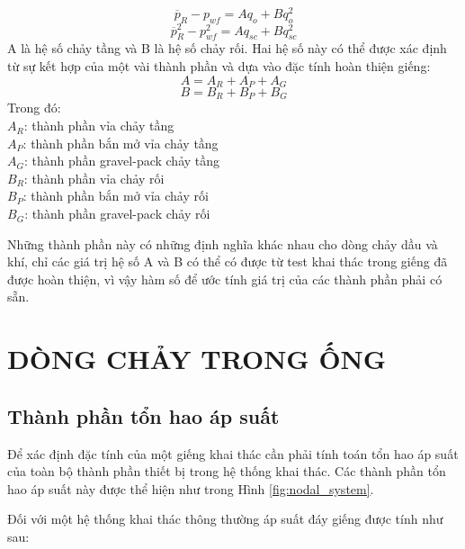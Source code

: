 \documentclass[12pt,a4paper]{report}
\begin{document}
	\begin{equation}
		\overline p_R - p_{wf} = Aq_o + Bq_o^2
	\end{equation}
	\begin{equation}
		\overline p_R^2 - p_{wf}^2 = Aq_{sc} + Bq_{sc}^2
	\end{equation}
A là hệ số chảy tầng và B là hệ số chảy rối. Hai hệ số này có thể được xác định từ sự kết hợp của một vài thành phần và dựa vào đặc tính hoàn thiện giếng:
	\begin{equation}
		A = A_R + A_P + A_G
	\end{equation}
	\begin{equation}
		B = B_R + B_P + B_G
	\end{equation}
Trong đó:\\
\hspace*{1cm}$A_R$: thành phần vỉa chảy tầng\\
\hspace*{1cm}$A_P$: thành phần bắn mở vỉa chảy tầng\\
\hspace*{1cm}$A_G$: thành phần gravel-pack chảy tầng\\
\hspace*{1cm}$B_R$: thành phần vỉa chảy rối\\
\hspace*{1cm}$B_P$: thành phần bắn mở vỉa chảy rối\\
\hspace*{1cm}$B_G$: thành phần gravel-pack chảy rối

Những thành phần này có những định nghĩa khác nhau cho dòng chảy dầu và khí, chỉ các giá trị hệ số A và B có thể có được từ test khai thác trong giếng đã được hoàn thiện, vì vậy hàm số để ước tính giá trị của các thành phần phải có sẵn.

\chapter{DÒNG CHẢY TRONG ỐNG}
\section{Thành phần tổn hao áp suất}

Để xác định đặc tính của một giếng khai thác cần phải tính toán tổn hao áp suất của toàn bộ thành phần thiết bị trong hệ thống khai thác. Các thành phần tổn hao áp suất này được thể hiện như trong Hình \ref{fig:nodal_system}.

Đối với một hệ thống khai thác thông thường áp suất đáy giếng được tính như sau:
\end{document}
